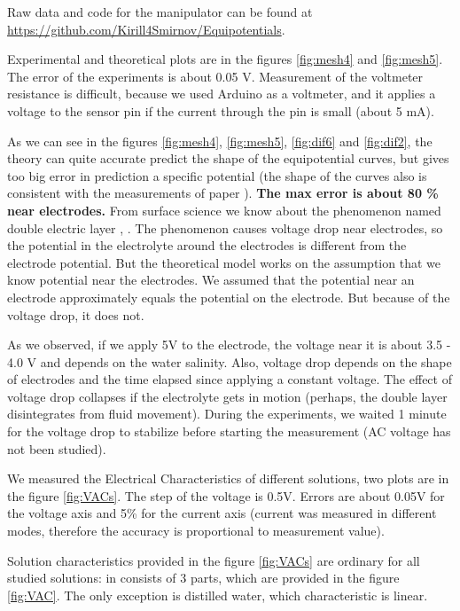 \documentclass{article}
\begin{document}
Raw data and code for the manipulator can be found at \url{https://github.com/Kirill4Smirnov/Equipotentials}. \par

Experimental and theoretical plots are in the figures \ref{fig:mesh4} and \ref{fig:mesh5}. The error of the experiments is about 0.05 V. Measurement of the voltmeter resistance is difficult, because we used Arduino as a voltmeter, and it applies a voltage to the sensor pin if the current through the pin is small (about 5 mA). \par


As we can see in the figures \ref{fig:mesh4}, \ref{fig:mesh5}, \ref{fig:dif6} and \ref{fig:dif2}, the theory can quite accurate predict the shape of the equipotential curves, but gives too big error in prediction a specific potential (the shape of the curves also is consistent with the measurements of paper \cite{binder2015high}). \textbf{The max error is about 80 \% near electrodes.} From surface science we know about the phenomenon named double electric layer \cite{kinetika}, \cite{stillinger}. The phenomenon causes voltage drop near electrodes, so the potential in the electrolyte around the electrodes is different from the electrode potential. But the theoretical model works on the assumption that we know potential near the electrodes. We assumed that the potential near an electrode approximately equals the potential on the electrode. But because of the voltage drop, it does not. \par


As we observed, if we apply 5V to the electrode, the voltage near it is about 3.5 - 4.0 V and depends on the water salinity. Also, voltage drop depends on the shape of electrodes and the time elapsed since applying a constant voltage. The effect of voltage drop collapses if the electrolyte gets in motion (perhaps, the double layer disintegrates from fluid movement). During the experiments, we waited 1 minute for the voltage drop to stabilize before starting the measurement (AC voltage has not been studied).\par

We measured the Electrical Characteristics of different solutions, two plots are in the figure \ref{fig:VACs}. The step of the voltage is 0.5V. Errors are about 0.05V for the voltage axis and 5\% for the current axis (current was measured in different modes, therefore the accuracy is proportional to measurement value).

Solution characteristics provided in the figure \ref{fig:VACs} are ordinary for all studied solutions: in consists of 3 parts, which are provided in the figure \ref{fig:VAC}. The only exception is distilled water, which characteristic is linear.
\end{document}
